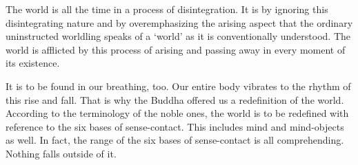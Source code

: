 The world is all the time in a process of disintegration. It is by ignoring this disintegrating nature and by overemphasizing the arising aspect that the ordinary uninstructed worldling speaks of a `world' as it is conventionally understood. The world is afflicted by this process of arising and passing away in every moment of its existence.

It is to be found in our breathing, too. Our entire body vibrates to the rhythm of this rise and fall. That is why the Buddha offered us a redefinition of the world. According to the terminology of the noble ones, the world is to be redefined with reference to the six bases of sense-contact. This includes mind and mind-objects as well. In fact, the range of the six bases of sense-contact is all comprehending. Nothing falls outside of it.

